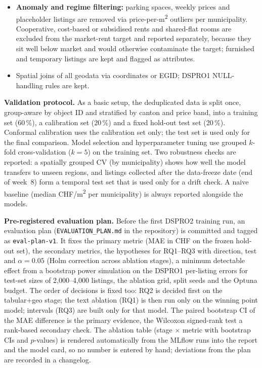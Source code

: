 \documentclass[11pt,a4paper]{article}
\begin{document}
\begin{itemize}
    \item \textbf{Anomaly and regime filtering:} parking spaces, weekly prices and placeholder listings are removed via price-per-m\textsuperscript{2} outliers per municipality. Cooperative, cost-based or subsidised rents and shared-flat rooms are excluded from the market-rent target and reported separately, because they sit well below market and would otherwise contaminate the target; furnished and temporary listings are kept and flagged as attributes.
    \item Spatial joins of all geodata via coordinates or EGID; DSPRO1 NULL-handling rules are kept.
\end{itemize}

\textbf{Validation protocol.} As a basic setup, the deduplicated data is split once, group-aware by object ID and stratified by canton and price band, into a training set (60\,\%), a calibration set (20\,\%) and a fixed hold-out test set (20\,\%). Conformal calibration uses the calibration set only; the test set is used only for the final comparison. Model selection and hyperparameter tuning use grouped $k$-fold cross-validation ($k=5$) on the training set. Two robustness checks are reported: a spatially grouped CV (by municipality) shows how well the model transfers to unseen regions, and listings collected after the data-freeze date (end of week~8) form a temporal test set that is used only for a drift check. A naive baseline (median CHF/m\textsuperscript{2} per municipality) is always reported alongside the models.

\textbf{Pre-registered evaluation plan.} Before the first DSPRO2 training run, an evaluation plan (\texttt{EVALUATION\_PLAN.md} in the repository) is committed and tagged as \texttt{eval-plan-v1}. It fixes the primary metric (MAE in CHF on the frozen hold-out set), the secondary metrics, the hypotheses for RQ1--RQ3 with direction, test and $\alpha = 0.05$ (Holm correction across ablation stages), a minimum detectable effect from a bootstrap power simulation on the DSPRO1 per-listing errors for test-set sizes of 2{,}000--4{,}000 listings, the ablation grid, split seeds and the Optuna budget. The order of decisions is fixed too: RQ2 is decided first on the tabular+geo stage; the text ablation (RQ1) is then run only on the winning point model; intervals (RQ3) are built only for that model. The paired bootstrap CI of the MAE difference is the primary evidence, the Wilcoxon signed-rank test a rank-based secondary check. The ablation table (stage $\times$ metric with bootstrap CIs and $p$-values) is rendered automatically from the MLflow runs into the report and the model card, so no number is entered by hand; deviations from the plan are recorded in a changelog.
\end{document}
